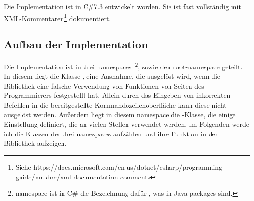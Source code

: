 Die Implementation ist in C\#7.3 entwickelt worden.
Sie ist fast vollständig mit XML-Kommentaren\footnote{Siehe https://docs.microsoft.com/en-us/dotnet/csharp/programming-guide/xmldoc/xml-documentation-comments} dokumentiert.
\subsection{Aufbau der Implementation}\label{subsec:Architecture}
Die Implementation ist in drei namespaces~\footnote{namespace ist in C\# die Bezeichnung dafür , was in Java packages sind.}, sowie den root-namespace geteilt.
In diesem liegt die Klasse , eine Ausnahme, die ausgelöst wird, wenn die Bibliothek eine falsche Verwendung von Funktionen von Seiten des Programmierers festgestellt hat.
Allein durch das Eingeben von inkorrekten Befehlen in die bereitgestellte Kommandozeilenoberfläche kann diese nicht ausgelöst werden.
Außerdem liegt in diesem namespace die -Klasse, die einige Einstellung definiert, die an vielen Stellen verwendet werden.
Im Folgenden werde ich die Klassen der drei namespaces aufzählen und ihre Funktion in der Bibliothek aufzeigen.
